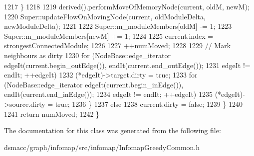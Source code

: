 \begin{DoxyCode}
1217             \}
1218 
1219             derived().performMoveOfMemoryNode(current, oldM, newM);
1220             Super::updateFlowOnMovingNode(current, oldModuleDelta, newModuleDelta);
1221 
1222             Super::m\_moduleMembers[oldM] -= 1;
1223             Super::m\_moduleMembers[newM] += 1;
1224 
1225             current.index = strongestConnectedModule;
1226 
1227             ++numMoved;
1228 
1229             \textcolor{comment}{// Mark neighbours as dirty}
1230             \textcolor{keywordflow}{for} (NodeBase::edge\_iterator edgeIt(current.begin\_outEdge()), endIt(current.end\_outEdge());
1231                     edgeIt != endIt; ++edgeIt)
1232                 (*edgeIt)->target.dirty = \textcolor{keyword}{true};
1233             for (NodeBase::edge\_iterator edgeIt(current.begin\_inEdge()), endIt(current.end\_inEdge());
1234                     edgeIt != endIt; ++edgeIt)
1235                 (*edgeIt)->source.dirty = \textcolor{keyword}{true};
1236         \}
1237         \textcolor{keywordflow}{else}
1238             current.dirty = \textcolor{keyword}{false};
1239     \}
1240 
1241     \textcolor{keywordflow}{return} numMoved;
1242 \}
\end{DoxyCode}


The documentation for this class was generated from the following file\+:\begin{DoxyCompactItemize}
\item 
dsmacc/graph/infomap/src/infomap/Infomap\+Greedy\+Common.\+h\end{DoxyCompactItemize}
